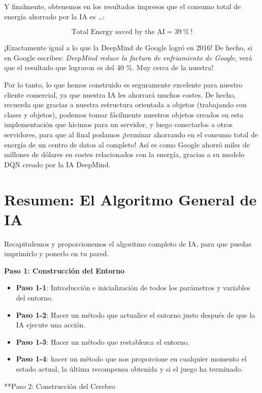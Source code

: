 \documentclass[]{book}
\providecommand{\tightlist}{%
  \setlength{\itemsep}{0pt}\setlength{\parskip}{0pt}}
\begin{document}
Y finalmente, obtenemos en los resultados impresos que el consumo total de energía ahorrado por la IA es \ldots{}:

\[\textrm{Total Energy saved by the AI} = 39 \ \% \ !\]

¡Exactamente igual a lo que la DeepMind de Google logró en 2016! De hecho, si en Google escribes: \emph{DeepMind reduce la factura de enfriamiento de Google}, verá que el resultado que lograron es del 40 \%. Muy cerca de la nuestra!

Por lo tanto, lo que hemos construido es seguramente excelente para nuestro cliente comercial, ya que nuestra IA les ahorrará muchos costes. De hecho, recuerda que gracias a nuestra estructura orientada a objetos (trabajando con clases y objetos), podemos tomar fácilmente nuestros objetos creados en esta implementación que hicimos para un servidor, y luego conectarlos a otros servidores, para que al final podamos ¡terminar ahorrando en el consumo total de energía de un centro de datos al completo! Así es como Google ahorró miles de millones de dólares en costes relacionados con la energía, gracias a su modelo DQN creado por la IA DeepMind.

\hypertarget{resumen-el-algoritmo-general-de-ia}{%
\section{Resumen: El Algoritmo General de IA}\label{resumen-el-algoritmo-general-de-ia}}

Recapitulemos y proporcionemos el algoritmo completo de IA, para que puedas imprimirlo y ponerlo en tu pared.

\textbf{Paso 1: Construcción del Entorno}

\begin{itemize}
\tightlist
\item
  \textbf{Paso 1-1}: Introducción e inicialización de todos los parámetros y variables del entorno.
\item
  \textbf{Paso 1-2}: Hacer un método que actualice el entorno justo después de que la IA ejecute una acción.
\item
  \textbf{Paso 1-3}: Hacer un método que restablezca el entorno.
\item
  \textbf{Paso 1-4}: hacer un método que nos proporcione en cualquier momento el estado actual, la última recompensa obtenida y si el juego ha terminado.
\end{itemize}

**Paso 2: Construcción del Cerebro
\end{document}
